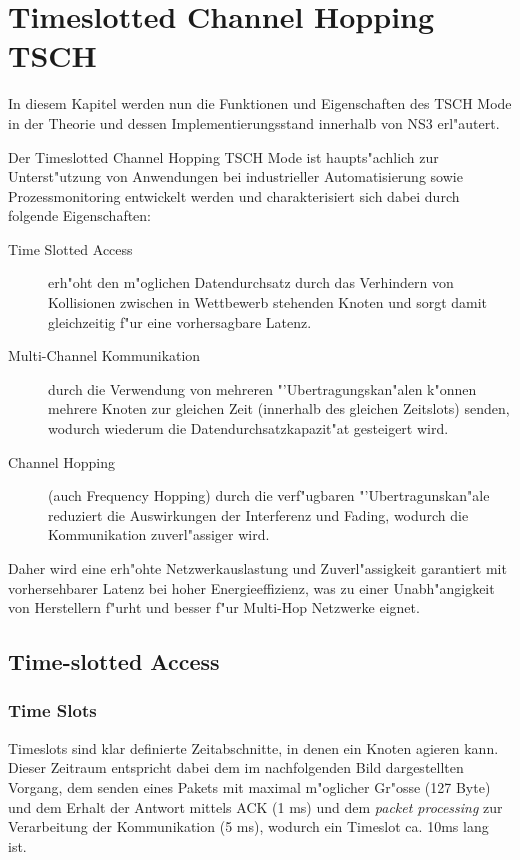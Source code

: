 \section{Timeslotted Channel Hopping TSCH} \label{Kap5-4}

In diesem Kapitel werden nun die Funktionen und Eigenschaften des TSCH Mode
in der Theorie und dessen Implementierungsstand innerhalb von NS3 erl"autert.

Der Timeslotted Channel Hopping TSCH Mode ist haupts"achlich zur Unterst"utzung
von Anwendungen bei industrieller Automatisierung sowie Prozessmonitoring entwickelt
werden und charakterisiert sich dabei durch folgende Eigenschaften:

\begin{description}
  \item[Time Slotted Access] erh"oht den m"oglichen Datendurchsatz durch das
  Verhindern von Kollisionen zwischen in Wettbewerb stehenden Knoten und sorgt
  damit gleichzeitig f"ur eine vorhersagbare Latenz.
  \item[Multi-Channel Kommunikation] durch die Verwendung von mehreren "'Ubertragungskan"alen
  k"onnen mehrere Knoten zur gleichen Zeit (innerhalb des gleichen Zeitslots) senden,
  wodurch wiederum die Datendurchsatzkapazit"at gesteigert wird.
  \item[Channel Hopping] (auch Frequency Hopping) durch die verf"ugbaren "'Ubertragunskan"ale
  reduziert die Auswirkungen der Interferenz und Fading, wodurch die Kommunikation
  zuverl"assiger wird.
\end{description}

Daher wird eine erh"ohte Netzwerkauslastung und Zuverl"assigkeit garantiert
mit vorhersehbarer Latenz bei hoher Energieeffizienz, was zu einer Unabh"angigkeit
von Herstellern f"urht und besser f"ur Multi-Hop Netzwerke eignet.


\subsection{Time-slotted Access}

\subsubsection{Time Slots}
\label{sec:timeslots}

Timeslots sind klar definierte Zeitabschnitte, in denen ein Knoten agieren kann.
Dieser Zeitraum entspricht dabei dem im nachfolgenden Bild dargestellten Vorgang,
dem senden eines Pakets mit maximal m"oglicher Gr"osse (127 Byte) und dem Erhalt
der Antwort mittels ACK (1 ms) und dem \textit{packet processing} zur Verarbeitung
der Kommunikation (5 ms), wodurch ein Timeslot ca. 10ms lang ist.

